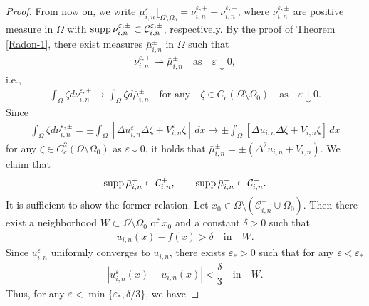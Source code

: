 \documentclass[12pt]{amsart}
\begin{document}
\begin{proof}
From now on, we write $\mu^{\varepsilon}_{i,n} \lfloor_{\Omega \setminus \Omega_0} = \nu^{{\varepsilon},+}_{i,n} - \nu^{{\varepsilon},-}_{i,n}$, where 
$\nu^{{\varepsilon},\pm}_{i,n}$ are positive measure in $\Omega$ 
with ${\rm supp}\, \nu^{{\varepsilon},\pm}_{i,n} \subset {\mathcal{C}}^{{\varepsilon},\pm}_{i,n}$, respectively. 
By the proof of Theorem \ref{Radon-1}, there exist measures $\bar{\mu}^{\pm}_{i,n}$ in $\Omega$ such that 
\begin{align*}
\nu^{{\varepsilon},\pm}_{i,n} \rightharpoonup \bar{\mu}^{\pm}_{i,n} \quad \text{as} \quad {\varepsilon} \downarrow 0, 
\end{align*} 
i.e., 
\begin{align*}
\int_\Omega {\zeta} d \nu^{{\varepsilon},\pm}_{i,n} \to \int_\Omega {\zeta} d \bar{\mu}^{\pm}_{i,n} 
\quad \text{for any} \quad {\zeta} \in C_c(\Omega \setminus \Omega_0) \quad \text{as} \quad {\varepsilon} \downarrow 0. 
\end{align*}
Since 
\begin{align*}
\int_\Omega {\zeta} d \nu^{{\varepsilon},\pm}_{i,n} 
 = \pm \int_\Omega \left[ \Delta u^{\varepsilon}_{i,n} \Delta {\zeta} + V^{\varepsilon}_{i,n} {\zeta} \right] \, dx 
 \to \pm \int_\Omega \left[ \Delta u_{i,n} \Delta {\zeta} + V_{i,n} {\zeta} \right] \, dx 
\end{align*}
for any ${\zeta} \in C^2_c(\Omega \setminus \Omega_0)$ as ${\varepsilon} \downarrow 0$,
it holds that $\bar{\mu}^{\pm}_{i,n} = \pm(\Delta^2 u_{i,n} + V_{i,n})$. We claim that 
\begin{align} \label{supp-mu-in-2}
{\rm supp} \, \bar{\mu}^+_{i,n} \subset {\mathcal{C}}^{+}_{i,n}, \qquad  {\rm supp} \, \bar{\mu}^{-}_{i,n} \subset {\mathcal{C}}^{-}_{i,n}. 
\end{align}
It is sufficient to show the former relation. 
Let $x_0 \in \Omega \setminus ({\mathcal{C}}^{+}_{i,n} \cup \Omega_0)$. 
Then there exist a neighborhood $W \subset \Omega \setminus \Omega_0$ of $x_0$ and a constant ${\delta}>0$ such that 
\begin{align*}
u_{i,n}(x) - f(x) > {\delta} \quad \text{in} \quad W. 
\end{align*}
Since $u^{\varepsilon}_{i,n}$ uniformly converges to $u_{i,n}$, there exists ${\varepsilon}_*>0$ such that for any ${\varepsilon} < {\varepsilon}_*$ 
\begin{align*}
{\left| {u^{\varepsilon}_{i,n}(x) - u_{i,n}(x)} \right|} < \dfrac{\delta}{3} \quad \text{in} \quad W.  
\end{align*}
Thus, for any ${\varepsilon} < \min\{ {\varepsilon}_*, {\delta}/3\}$, we have 

\end{proof}
\end{document}
